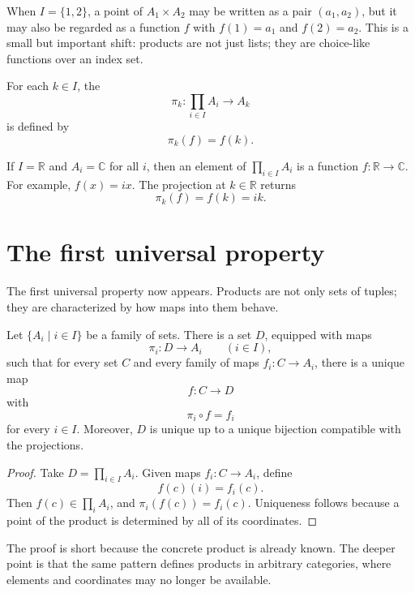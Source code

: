 \begin{remark}
When \(I=\{1,2\}\), a point of \(A_1\times A_2\) may be written as a pair \((a_1,a_2)\), but it may also be regarded as a function \(f\) with \(f(1)=a_1\) and \(f(2)=a_2\).  This is a small but important shift: products are not just lists; they are choice-like functions over an index set.
\end{remark}

For each \(k\in I\), the 
\[
  \pi_k:\prod_{i\in I}A_i\to A_k
\]
is defined by
\[
  \pi_k(f)=f(k).
\]

\begin{example}
If \(I=\mathbb R\) and \(A_i=\mathbb C\) for all \(i\), then an element of \(\prod_{i\in I}A_i\) is a function \(f:\mathbb R\to\mathbb C\).  For example, \(f(x)=ix\).  The projection at \(k\in\mathbb R\) returns
\[
  \pi_k(f)=f(k)=ik.
\]
\end{example}

\section{The first universal property}

The first universal property now appears.  Products are not only sets of tuples; they are characterized by how maps into them behave.

\begin{theorem}
Let \(\{A_i\mid i\in I\}\) be a family of sets.  There is a set \(D\), equipped with maps
\[
  \pi_i:D\to A_i \qquad (i\in I),
\]
such that for every set \(C\) and every family of maps \(f_i:C\to A_i\), there is a unique map
\[
  f:C\to D
\]
with
\[
  \pi_i\circ f=f_i
\]
for every \(i\in I\).  Moreover, \(D\) is unique up to a unique bijection compatible with the projections.
\end{theorem}

\begin{proof}
Take \(D=\prod_{i\in I}A_i\).  Given maps \(f_i:C\to A_i\), define
\[
  f(c)(i)=f_i(c).
\]
Then \(f(c)\in\prod_i A_i\), and \(\pi_i(f(c))=f_i(c)\).  Uniqueness follows because a point of the product is determined by all of its coordinates.
\end{proof}

\begin{remark}
The proof is short because the concrete product is already known.  The deeper point is that the same pattern defines products in arbitrary categories, where elements and coordinates may no longer be available.
\end{remark}

